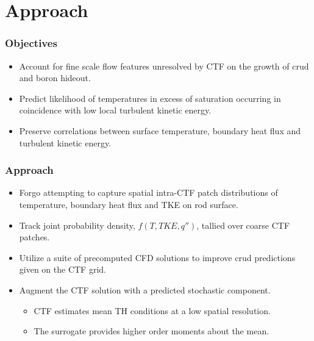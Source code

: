 \documentclass[t, pdftex]{beamer}
\begin{document}
\section{Approach}
\begin{frame}\frametitle{Objectives}
\begin{itemize}
    \item Account for fine scale flow features unresolved by CTF on the growth of crud and boron hideout. \\

    \item Predict likelihood of temperatures in excess of saturation occurring in coincidence with low local turbulent kinetic energy. \\
    
    \item Preserve correlations between surface temperature, boundary heat flux and turbulent kinetic energy.
\end{itemize}
\end{frame}

\begin{frame}\frametitle{Approach}
\begin{itemize}
\item Forgo attempting to capture spatial intra-CTF patch distributions of temperature, boundary heat flux and TKE on rod surface. 
\item Track joint probability density, $f(T, TKE, q'')$, tallied over coarse CTF patches.
    \item Utilize a suite of precomputed CFD solutions to improve crud predictions given on the CTF grid. 
    \item Augment the CTF solution with a predicted stochastic component.
    \begin{itemize}
        \item CTF estimates mean TH conditions at a low spatial resolution.  
        \item The surrogate provides higher order moments about the mean.
    \end{itemize}
\end{itemize}
\end{frame}
\end{document}
